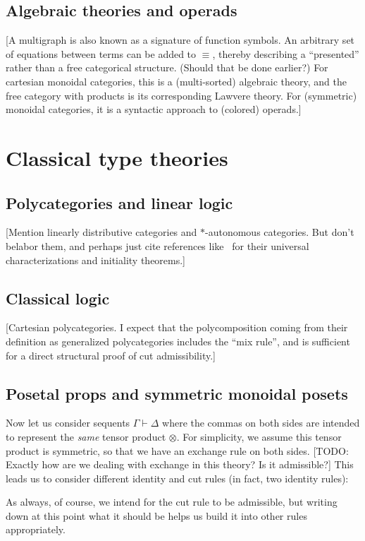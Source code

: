 \documentclass{book}
\let\types\vdash
\let\tensor\otimes
\begin{document}
\section{Algebraic theories and operads}
\label{sec:algthy-opd}

[A multigraph is also known as a signature of function symbols.
An arbitrary set of equations between terms can be added to $\equiv$, thereby describing a ``presented'' rather than a free categorical structure.
(Should that be done earlier?)
For cartesian monoidal categories, this is a (multi-sorted) algebraic theory, and the free category with products is its corresponding Lawvere theory.
For (symmetric) monoidal categories, it is a syntactic approach to (colored) operads.]



\chapter{Classical type theories}
\label{chap:polycats}


\section{Polycategories and linear logic}
\label{sec:cllin}

[Mention linearly distributive categories and $\ast$-autonomous categories.
But don't belabor them, and perhaps just cite references like~\cite{cs:wkdistrib} for their universal characterizations and initiality theorems.]


\section{Classical logic}
\label{sec:classical}

[Cartesian polycategories.  I expect that the polycomposition coming from their definition as generalized polycategories includes the ``mix rule'', and is sufficient for a direct structural proof of cut admissibility.]


\section{Posetal props and symmetric monoidal posets}
\label{sec:proppos-smpos}

Now let us consider sequents $\Gamma\types\Delta$ where the commas on both sides are intended to represent the \emph{same} tensor product $\tensor$.
For simplicity, we assume this tensor product is symmetric, so that we have an exchange rule on both sides.
[TODO: Exactly how are we dealing with exchange in this theory?  Is it admissible?]
This leads us to consider different identity and cut rules (in fact, two identity rules):
As always, of course, we intend for the cut rule to be admissible, but writing down at this point what it should be helps us build it into other rules appropriately.
\end{document}
